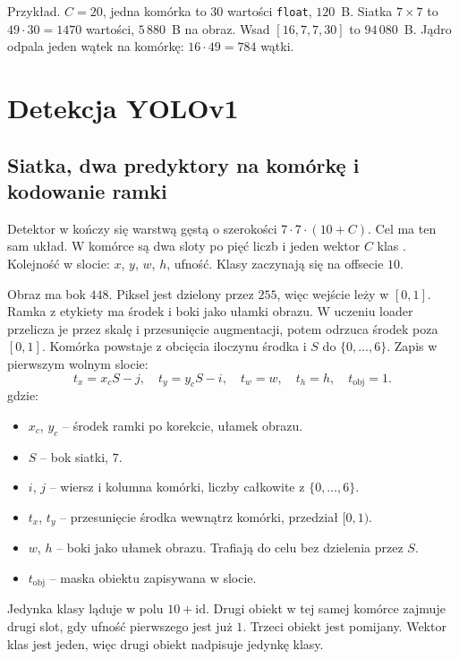 Przykład. \(C = 20\), jedna komórka to \(30\) wartości \texttt{float}, \(120\)~B. Siatka \(7 \times 7\) to \(49 \cdot 30 = 1470\) wartości, \(5\,880\)~B na obraz. Wsad \([16, 7, 7, 30]\) to \(94\,080\)~B. Jądro odpala jeden wątek na komórkę: \(16 \cdot 49 = 784\) wątki.

\section{Detekcja YOLOv1}

\subsection{Siatka, dwa predyktory na komórkę i kodowanie ramki}

Detektor w  kończy się warstwą gęstą o szerokości \(7 \cdot 7 \cdot (10 + C)\). Cel ma ten sam układ. W komórce są dwa sloty po pięć liczb i jeden wektor \(C\) klas \cite{redmon2016yolo}. Kolejność w slocie: \(x\), \(y\), \(w\), \(h\), ufność. Klasy zaczynają się na offsecie \(10\).

Obraz ma bok \(448\). Piksel jest dzielony przez \(255\), więc wejście leży w \([0, 1]\). Ramka z etykiety ma środek i boki jako ułamki obrazu. W uczeniu loader przelicza je przez skalę i przesunięcie augmentacji, potem odrzuca środek poza \([0, 1]\). Komórka powstaje z obcięcia iloczynu środka i \(S\) do \(\{0, \ldots, 6\}\). Zapis w pierwszym wolnym slocie:
\begin{equation}
\label{eq:yolo-encode}
t_x = x_c S - j,
\quad
t_y = y_c S - i,
\quad
t_w = w,
\quad
t_h = h,
\quad
t_{\mathrm{obj}} = 1.
\end{equation}
gdzie:
\begin{itemize}
\item \(x_c\), \(y_c\) -- środek ramki po korekcie, ułamek obrazu.
\item \(S\) -- bok siatki, \(7\).
\item \(i\), \(j\) -- wiersz i kolumna komórki, liczby całkowite z \(\{0, \ldots, 6\}\).
\item \(t_x\), \(t_y\) -- przesunięcie środka wewnątrz komórki, przedział \([0, 1)\).
\item \(w\), \(h\) -- boki jako ułamek obrazu. Trafiają do celu bez dzielenia przez \(S\).
\item \(t_{\mathrm{obj}}\) -- maska obiektu zapisywana w slocie.
\end{itemize}

Jedynka klasy ląduje w polu \(10 + \mathrm{id}\). Drugi obiekt w tej samej komórce zajmuje drugi slot, gdy ufność pierwszego jest już \(1\). Trzeci obiekt jest pomijany. Wektor klas jest jeden, więc drugi obiekt nadpisuje jedynkę klasy.

